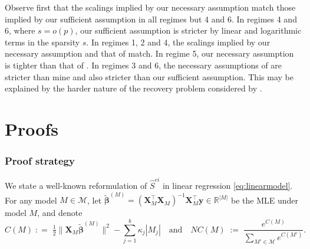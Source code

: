 \documentclass[
  12pt]{article}
\newcommand{\R}{\mathbb{R}}
\newcommand{\M}{\mathcal{M}}
\newcommand{\by}{\mathbf{y}}
\newcommand{\bbeta}{\boldsymbol{\beta}}
\newcommand{\bX}{\mathbf{X}}
\begin{document}

Observe first that the scalings implied by our necessary assumption match those implied by our sufficient assumption in all regimes but 4 and 6. In regimes 4 and 6, where $s=o(p)$, our sufficient assumption is stricter by linear and logarithmic terms in the sparsity $s$. In regimes 1, 2 and 4, the scalings implied by our necessary assumption and that of \cite{wang2010} match. In regime 5, our necessary assumption is tighter than that of \cite{wang2010}. In regimes 3 and 6, the necessary assumptions of \cite{wang2010} are stricter than mine and also stricter than our sufficient assumption. This may be explained by the harder nature of the recovery problem considered by \cite{wang2010}. 


\section{Proofs}

\subsubsection{Proof strategy}
\label{ssec:regression_proof_strategy}


We state a well-known
reformulation of $\hat{S}^{ei}$ in linear regression \eqref{eq:linearmodel}. For any model $M\in \M$, let $\tilde{\bbeta}^{(M)}= (\bX_{\!\!M}^\top \bX_{\!\!M})^{-1}\bX_{\!\!M}^\top\by \in \R^{|M|}$ be the MLE under model $M$, and denote
\begin{equation}\label{eq:CM}
    C(M)\;: =\;\tfrac{1}{2}\|\bX_M\tilde{\bbeta}^{(M)}\|^2-\sum_{j=1}^b\kappa_j |M_j|\quad\text{and}\quad NC(M)\;:=\;\frac{e^{C(M)}}{\underset{M' \in \M}{\sum} e^{C(M')}}.
\end{equation}
\end{document}
